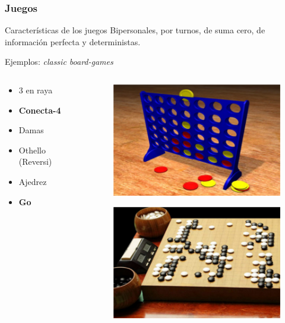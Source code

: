 \documentclass[10pt]{beamer}
\begin{document}
\begin{frame}[t]
\frametitle{Juegos}
\begin{block}{Características de los juegos}
Bipersonales, por turnos, de suma cero, de información perfecta y deterministas.
\end{block}

\begin{exampleblock}{Ejemplos: \textit{classic board-games}}
	\begin{columns}

		\begin{column}{0.5\linewidth}
\begin{itemize}
\item 3 en raya
\item \textbf{Conecta-4}
\item Damas
\item Othello (Reversi)
\item Ajedrez
\item \textbf{Go}
\end{itemize}
		\end{column}
		\begin{column}{0.5\linewidth}
			\begin{figure}[t]
				\centering
				\includegraphics[scale=0.4]{imagenes/connect4.png}
				\label{fig:conecta4}
			\end{figure}
			\begin{figure}[t]
				\centering
				\includegraphics[scale=0.2]{imagenes/go.png}
				\label{fig:go}
			\end{figure}			
		\end{column}

	\end{columns}
\end{exampleblock}

\end{frame}
\end{document}
